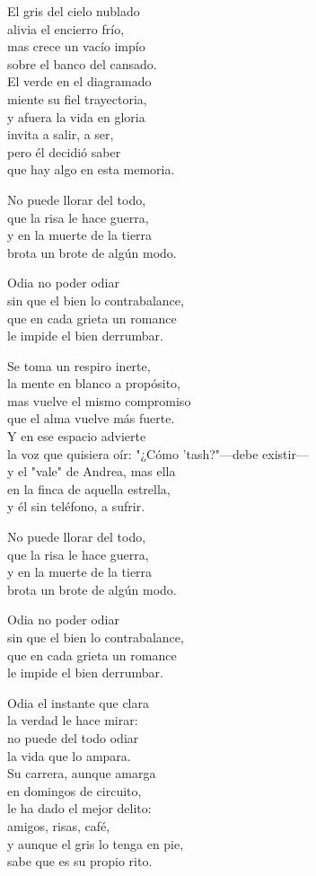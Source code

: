 \begin{lyrics}
El gris del cielo nublado\\
alivia el encierro frío,\\
mas crece un vacío impío\\
sobre el banco del cansado.\\
El verde en el diagramado\\
miente su fiel trayectoria,\\
y afuera la vida en gloria\\
invita a salir, a ser,\\
pero él decidió saber\\
que hay algo en esta memoria.

No puede llorar del todo,\\
que la risa le hace guerra,\\
y en la muerte de la tierra\\
brota un brote de algún modo.

Odia no poder odiar\\
sin que el bien lo contrabalance,\\
que en cada grieta un romance\\
le impide el bien derrumbar.

Se toma un respiro inerte,\\
la mente en blanco a propósito,\\
mas vuelve el mismo compromiso\\
que el alma vuelve más fuerte.\\
Y en ese espacio advierte\\
la voz que quisiera oír:
"¿Cómo 'tash?"—debe existir—\\
y el "vale" de Andrea, mas ella\\
en la finca de aquella estrella,\\
y él sin teléfono, a sufrir.

No puede llorar del todo,\\
que la risa le hace guerra,\\
y en la muerte de la tierra\\
brota un brote de algún modo.

Odia no poder odiar\\
sin que el bien lo contrabalance,\\
que en cada grieta un romance\\
le impide el bien derrumbar.

Odia el instante que clara\\
la verdad le hace mirar:\\
no puede del todo odiar\\
la vida que lo ampara.\\
Su carrera, aunque amarga\\
en domingos de circuito,\\
le ha dado el mejor delito:\\
amigos, risas, café,\\
y aunque el gris lo tenga en pie,\\
sabe que es su propio rito.


\end{lyrics}
